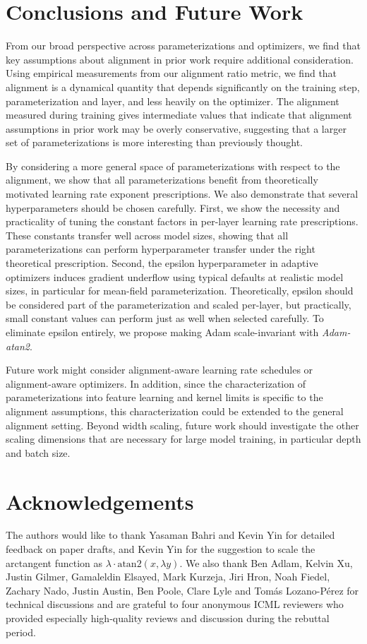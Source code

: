\documentclass{article}
\theoremstyle{plain}
\theoremstyle{definition}
\theoremstyle{remark}
\begin{document}
\section{Conclusions and Future Work}
From our broad perspective across parameterizations and optimizers, we find that key assumptions about alignment in prior work require additional consideration. Using empirical measurements from our alignment ratio metric, we find that alignment is a dynamical quantity that depends significantly on the training step, parameterization and layer, and less heavily on the optimizer. The alignment measured during training gives intermediate values that indicate that alignment assumptions in prior work may be overly conservative, suggesting that a larger set of parameterizations is more interesting than previously thought.

By considering a more general space of parameterizations with respect to the alignment, we show that all parameterizations benefit from theoretically motivated learning rate exponent prescriptions. We also demonstrate that several hyperparameters should be chosen carefully. First, we show the necessity and practicality of tuning the constant factors in per-layer learning rate prescriptions. These constants transfer well across model sizes, showing that all parameterizations can perform hyperparameter transfer under the right theoretical prescription. Second, the epsilon hyperparameter in adaptive optimizers induces gradient underflow using typical defaults at realistic model sizes, in particular for mean-field parameterization. Theoretically, epsilon should be considered part of the parameterization and scaled per-layer, but practically, small constant values can perform just as well when selected carefully. To eliminate epsilon entirely, we propose making Adam scale-invariant with \emph{Adam-atan2}.

Future work might consider alignment-aware learning rate schedules or alignment-aware optimizers. In addition, since the characterization of parameterizations into feature learning and kernel limits is specific to the alignment assumptions, this characterization could be extended to the general alignment setting. Beyond width scaling, future work should investigate the other scaling dimensions that are necessary for large model training, in particular depth and batch size.


\clearpage

\section*{Acknowledgements}
The authors would like to thank Yasaman Bahri and Kevin Yin for detailed feedback on paper drafts, and Kevin Yin for the suggestion to scale the arctangent function as $\lambda \cdot \textrm{atan2}(x, \lambda y)$. We also thank Ben Adlam, Kelvin Xu, Justin Gilmer, Gamaleldin Elsayed, Mark Kurzeja, Jiri Hron, Noah Fiedel, Zachary Nado, Justin Austin, Ben Poole, Clare Lyle and Tomás Lozano-Pérez for technical discussions and are grateful to four anonymous ICML reviewers who provided especially high-quality reviews and discussion during the rebuttal period.
\end{document}
